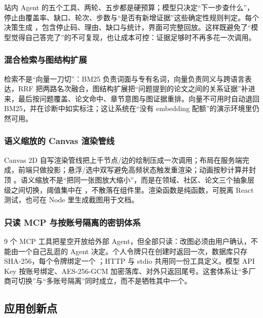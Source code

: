 站内 Agent 的五个工具、两轮、五步都是硬预算；模型只决定“下一步查什么”，停止由覆盖率、缺口、轮次、步数与“是否有新增证据”这些确定性规则判定。每个决策生成 ，包含停止码、理由、缺口与统计，界面可完整回放。这样既避免了“模型觉得自己答完了”的不可复现，也让成本可控：证据足够时不再多花一次调用。

\subsubsection{混合检索与图结构扩展}

检索不是“向量一刀切”：BM25 负责词面与专有名词，向量负责同义与跨语言表达，RRF 把两路名次融合，图结构扩展把“问题提到的论文之间的关系证据”补进来，最后按问题覆盖、论文命中、章节意图与图证据重排。向量不可用时自动退回 BM25，并在诊断中如实标注；这让系统在“没有 embedding 配额”的演示环境里仍然可用。

\subsubsection{语义缩放的 Canvas 渲染管线}

Canvas 2D 自写渲染管线把上千节点/边的绘制压成一次调用；布局在服务端完成，前端只做投影；悬浮/选中双写避免高频状态触发重渲染；动画按秒计算并封顶 。语义缩放不是“把同一张图放大缩小”，而是在领域、社区、论文三个抽象层级之间切换，阈值集中在 ，不散落在组件里。渲染函数是纯函数，可脱离 React 测试，也可在 Node 里生成截图用于文档。

\subsubsection{只读 MCP 与按账号隔离的密钥体系}

9 个 MCP 工具把星空开放给外部 Agent，但全部只读：改图必须由用户确认，不能由一个自己乱逛的 Agent 决定。个人令牌只在创建时返回一次，数据库只存 SHA-256，每个令牌绑定一个 ；HTTP 与 stdio 共用同一份工具定义。模型 API Key 按账号绑定、AES-256-GCM 加密落库、对外只返回尾号。这套体系让“多厂商可切换”与“多账号隔离”同时成立，而不是牺牲其中一个。

\subsection{应用创新点}

